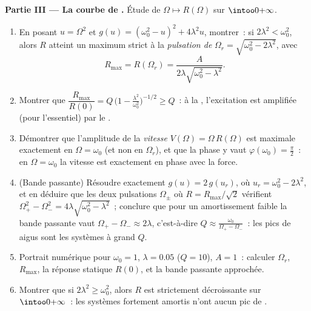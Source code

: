 \begin{problem}
\medskip
\noindent\textbf{Partie III --- La courbe de .} Étude de
$\Omega \mapsto R(\Omega)$ sur $\intoo0{+\infty}$.
\begin{enumerate}[resume]
  \item En posant $u = \Omega^2$ et $g(u) = (\omega_0^2 - u)^2 +
        4\lambda^2 u$, montrer~: si $2\lambda^2 < \omega_0^2$, alors
        $R$ atteint un maximum strict à la \emph{pulsation de
        } $\Omega_r = \sqrt{\omega_0^2 - 2\lambda^2}$, avec
        \[
        R_{\max} = R(\Omega_r)
        = \frac{A}{2\lambda\sqrt{\omega_0^2 - \lambda^2}} .
        \]
  \item Montrer que $\dfrac{R_{\max}}{R(0)} = Q\,\bigl(1 -
        \tfrac{\lambda^2}{\omega_0^2}\bigr)^{-1/2} \geq Q$~: à la
        , l'excitation est amplifiée (pour l'essentiel) par
        le .
  \item Démontrer que l'amplitude de la \emph{vitesse} $V(\Omega) =
        \Omega\,R(\Omega)$ est maximale exactement en $\Omega =
        \omega_0$ (et non en $\Omega_r$), et que la phase y vaut
        $\varphi(\omega_0) = \frac\pi2$~: en $\Omega = \omega_0$ la
        vitesse est exactement en phase avec la force.
  \item (Bande passante) Résoudre exactement $g(u) = 2\,g(u_r)$, où
        $u_r = \omega_0^2 - 2\lambda^2$, et en déduire que les deux
        pulsations $\Omega_\pm$ où $R = R_{\max}/\sqrt2$ vérifient
        $\Omega_+^2 - \Omega_-^2 = 4\lambda\sqrt{\omega_0^2 -
        \lambda^2}$~; conclure que pour un amortissement faible la
        bande passante vaut $\Omega_+ - \Omega_- \approx 2\lambda$,
        c'est-à-dire $Q \approx \frac{\omega_0}{\Omega_+ -
        \Omega_-}$~: les pics de  aigus sont les systèmes à
        grand $Q$.
  \item Portrait numérique pour $\omega_0 = 1$, $\lambda = 0.05$
        ($Q = 10$), $A = 1$~: calculer $\Omega_r$, $R_{\max}$, la
        réponse statique $R(0)$, et la bande passante approchée.
  \item Montrer que si $2\lambda^2 \geq \omega_0^2$, alors $R$ est
        strictement décroissante sur $\intoo0{+\infty}$~: les systèmes
        fortement amortis n'ont aucun pic de .
\end{enumerate}


\end{problem}
